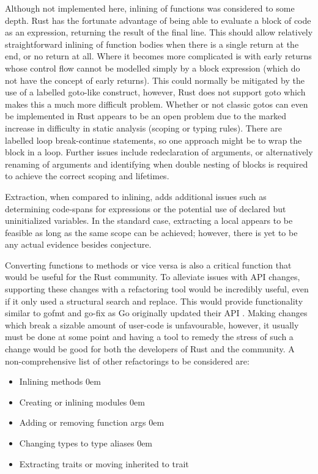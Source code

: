Although not implemented here, inlining of functions was considered to some depth. Rust has the fortunate advantage of being able to evaluate a block of code as an expression, returning the result of the final line. This should allow relatively straightforward inlining of function bodies when there is a single return at the end, or no return at all. Where it becomes more complicated is with early returns whose control flow cannot be modelled simply by a block expression (which do not have the concept of early returns). This could normally be mitigated by the use of a labelled goto-like construct, however, Rust does not support goto which makes this a much more difficult problem. Whether or not classic gotos can even be implemented in Rust appears to be an open problem due to the marked increase in difficulty in static analysis (scoping or typing rules). There are labelled loop break-continue statements, so one approach might be to wrap the block in a loop. Further issues include redeclaration of arguments, or alternatively renaming of arguments and identifying when double nesting of blocks is required to achieve the correct scoping and lifetimes. 

Extraction, when compared to inlining, adds additional issues such as determining code-spans for expressions or the potential use of declared but uninitialized variables. In the standard case, extracting a local appears to be feasible as long as the same scope can be achieved; however, there is yet to be any actual evidence besides conjecture.

Converting functions to methods or vice versa is also a critical function that would be useful for the Rust community. To alleviate issues with API changes, supporting these changes with a refactoring tool would be incredibly useful, even if it only used a structural search and replace. This would provide functionality similar to gofmt and go-fix as Go originally updated their API \cite{gofix11}. Making changes which break a sizable amount of user-code is unfavourable, however, it usually must be done at some point and having a tool to remedy the stress of such a change would be good for both the developers of Rust and the community. A non-comprehensive list of other refactorings to be considered are:

\begin{multicols}{2}
\begin{itemize}
\item Inlining methods
\itemsep0em 
\item Creating or inlining modules
\itemsep0em 
\item Adding or removing function args
\itemsep0em 
\item Changing types to type aliases
\itemsep0em 
\item Extracting traits or moving inherited to trait
\end{itemize}
\end{multicols}

